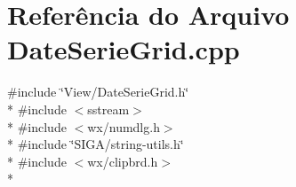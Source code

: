 \section{Referência do Arquivo Date\+Serie\+Grid.\+cpp}
\label{_date_serie_grid_8cpp}
{\ttfamily \#include \char`\"{}View/\+Date\+Serie\+Grid.\+h\char`\"{}}\\*
{\ttfamily \#include $<$sstream$>$}\\*
{\ttfamily \#include $<$wx/numdlg.\+h$>$}\\*
{\ttfamily \#include \char`\"{}S\+I\+G\+A/string-\/utils.\+h\char`\"{}}\\*
{\ttfamily \#include $<$wx/clipbrd.\+h$>$}\\*
